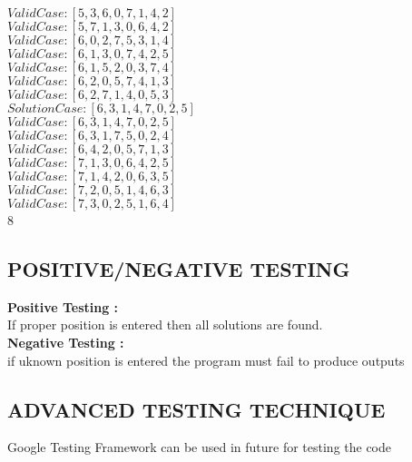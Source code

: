 \documentclass{article}
\begin{document}
	$Valid Case   : [5, 3, 6, 0, 7, 1, 4, 2]$\\
	$Valid Case   : [5, 7, 1, 3, 0, 6, 4, 2]$\\
	$Valid Case   : [6, 0, 2, 7, 5, 3, 1, 4]$\\
	$Valid Case   : [6, 1, 3, 0, 7, 4, 2, 5]$\\
	$Valid Case   : [6, 1, 5, 2, 0, 3, 7, 4]$\\
	$Valid Case   : [6, 2, 0, 5, 7, 4, 1, 3]$\\
	$Valid Case   : [6, 2, 7, 1, 4, 0, 5, 3]$\\
	$Solution Case: [6, 3, 1, 4, 7, 0, 2, 5]$\\
	$Valid Case   : [6, 3, 1, 4, 7, 0, 2, 5]$\\
	$Valid Case   : [6, 3, 1, 7, 5, 0, 2, 4]$\\
	$Valid Case   : [6, 4, 2, 0, 5, 7, 1, 3]$\\
	$Valid Case   : [7, 1, 3, 0, 6, 4, 2, 5]$\\
	$Valid Case   : [7, 1, 4, 2, 0, 6, 3, 5]$\\
	$Valid Case   : [7, 2, 0, 5, 1, 4, 6, 3]$\\
	$Valid Case   : [7, 3, 0, 2, 5, 1, 6, 4]$\\
	8
	
	\subsection{ POSITIVE/NEGATIVE TESTING }
	
	\textbf{Positive Testing :}\\
	If proper position is entered then all solutions are found.\\
	\textbf{ Negative Testing :}\\
	if uknown position is entered the program must fail to produce outputs
	
	
	\subsection{ADVANCED TESTING TECHNIQUE}
	Google Testing Framework can be used in future for testing the code
\end{document}
